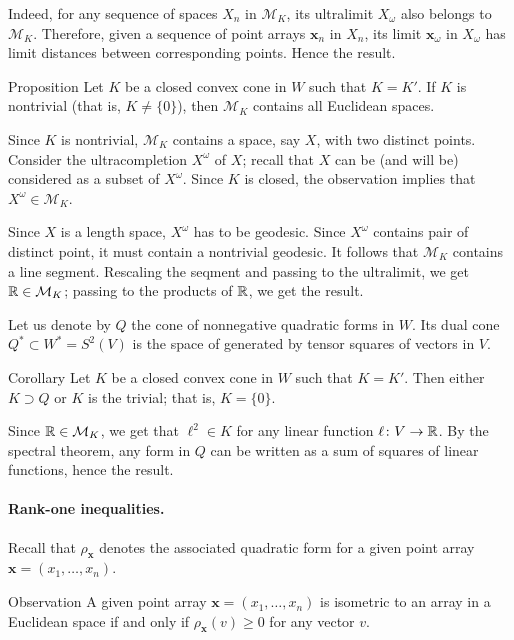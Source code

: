 \documentclass[a4paper,10pt]{article}
\begin{document}
Indeed, for any sequence of spaces $X_n$ in $\mathcal{M}_K$, its ultralimit $X_\omega$ also belongs to $\mathcal{M}_K$.
Therefore, given a sequence of point arrays $\bm{x}_n$ in $X_n$,
its limit $\bm{x}_\omega$ in $X_\omega$ has limit distances between corresponding points.
Hence the result.
\qeds

\begin{thm}{Proposition}
Let $K$ be a closed convex cone in $W$ such that $K=K'$.
If $K$ is nontrivial (that is, $K\ne \{0\}$), then $\mathcal{M}_K$ contains all Euclidean spaces.
\end{thm}

Since $K$ is nontrivial, $\mathcal{M}_K$ contains a space, say $X$, with two distinct points.
Consider the ultracompletion $X^\omega$ of $X$;
recall that $X$ can be (and will be) considered as a subset of $X^\omega$.
Since $K$ is closed, the observation implies that $X^\omega\in \mathcal{M}_K$.

Since  $X$ is a length space, $X^\omega$ has to be geodesic.
Since $X^\omega$ contains pair of distinct point, it must contain a nontrivial geodesic.
It follows that $\mathcal{M}_K$ contains a line segment.
Rescaling the seqment and passing to the ultralimit, we get $\mathbb{R}\in \mathcal{M}_K$;
passing to the products of $\mathbb{R}$, we get the result. 
\qeds

Let us denote by $Q$ the cone of nonnegative quadratic forms in $W$.
Its dual cone $Q^*\subset W^*=S^2(V)$ is the space of generated by tensor squares of vectors in $V$. 

\begin{thm}{Corollary}
Let $K$ be a closed convex cone in $W$ such that $K=K'$.
Then either $K\supset Q$ or $K$ is the trivial; that is, $K=\{0\}$.
\end{thm}

Since $\mathbb{R}\in \mathcal{M}_K$, we get that $\ell^2\in K$ for any linear function $\ell\colon V\to\mathbb{R}$.
By the spectral theorem, any form in $Q$ can be written as a sum of squares of linear functions, hence the result.
\qeds

\paragraph{Rank-one inequalities.}\label{par:rank-one}
Recall that $\rho_{\bm{x}}$ denotes the associated quadratic form for a given point array $\bm{x}=(x_1,\dots,x_n)$.

\begin{thm}{Observation}
A given point array $\bm{x}=(x_1,\dots,x_n)$ is isometric to an array in a Euclidean space if and only if $\rho_{\bm{x}}(v)\ge 0$ for any vector $v$.
\end{thm}
\end{document}
